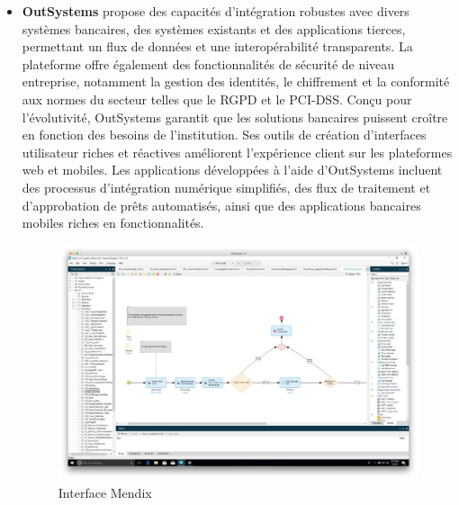 \begin{itemize}

    \item \textbf{OutSystems} propose des capacités d'intégration robustes avec divers systèmes bancaires, des systèmes existants et des applications tierces, permettant un flux de données et une interopérabilité transparents. La plateforme offre également des fonctionnalités de sécurité de niveau entreprise, notamment la gestion des identités, le chiffrement et la conformité aux normes du secteur telles que le RGPD et le PCI-DSS. Conçu pour l'évolutivité, OutSystems garantit que les solutions bancaires puissent croître en fonction des besoins de l'institution. Ses outils de création d'interfaces utilisateur riches et réactives améliorent l'expérience client sur les plateformes web et mobiles. Les applications développées à l'aide d'OutSystems incluent des processus d'intégration numérique simplifiés, des flux de traitement et d'approbation de prêts automatisés, ainsi que des applications bancaires mobiles riches en fonctionnalités.



          \begin{figure}[H]
              \centering
              \includegraphics[width=15cm]{Figures/mendix.jpg}
              \caption{Interface Mendix}
              \label{fig:my_label} %
          \end{figure}



\end{itemize}
